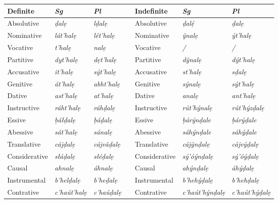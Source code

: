 \documentclass[a4paper, 12pt, twoside, openright, final]{book}
\let \nf \normalfont
\begin{document}
\noindent\begin{longtable}{l|>{\it}l|>{\it}lll|>{\it}l|>{\it}l}
Definite    &\nf Sg&\nf Pl && Indefinite&\nf Sg&\nf Pl\\\cline{1-3}\cline{5-7}
\endhead
Absolutive    & ḍalẹ         & lḍalẹ      && Absolutive    & ḍalẹ́            & ḍalẹ        \\
Nominative    & lát’halẹ     & lét’halẹ   && Nominative    & ŷnalẹ           & ýt’halẹ     \\
Vocative      & t’halẹ       & nalẹ       && Vocative      & /               & /           \\
Partitive     & dyt’halẹ     & dẹt’halẹ   && Partitive     & dŷnalẹ          & dýt’halẹ    \\
Accusative    & it’halẹ      & sýt’halẹ   && Accusative    & st’halẹ         & sḍalẹ       \\
Genitive      & át’halẹ      & abht’halẹ  && Genitive      & sýnalẹ          & sýt’halẹ    \\
Dative        & ast’halẹ     & at’halẹ    && Dative        & analẹ           & ant’halẹ    \\
Instructive   & ráht’halẹ    & ráhḍalẹ    && Instructive   & rút’hýnalẹ      & rút’hýzḍalẹ \\\cline{1-3}\cline{5-7}

Essive        & ḅáłḍalẹ      & ḅáḍalẹ     && Essive        & ḅárýnḍale       & ḅárýḍale    \\
Abessive      & sát’halẹ     & sánalẹ     && Abessive      & sáhýnḍale       & sáhýḍale    \\
Translative   & cájḍalẹ      & cájvâḍalẹ  && Translative   & cájŷnḍalẹ       & cájvýḍalẹ   \\
Considerative & słáḍalẹ      & słéḍalẹ    && Considerative & sý’óýnḍalẹ      & sý’óýḍalẹ   \\
Causal        & ahnalẹ       & áhnalẹ     && Causal        & ahýnḍalẹ        & áhýḍalẹ     \\
Instrumental  & b’helḍalẹ    & b’heḍalẹ   && Instrumental  & b’hehýḍalẹ      & b’hehḍalẹ   \\
Contrative    & c’haút’halẹ  & c’haúḍalẹ  && Contrative    & c’haút’hýnḍalẹ  & c’haút’hýḍalẹ \\\cline{1-3}\cline{5-7}


\end{longtable}
\end{document}
